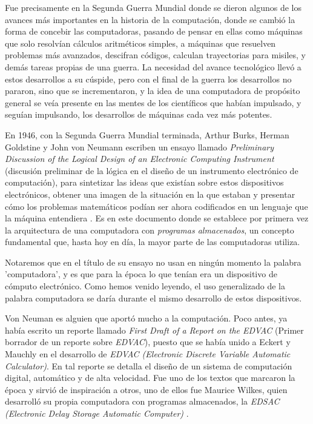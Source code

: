 \documentclass[letterpaper,12pt,oneside]{book}
\begin{document}
		Fue precisamente en la Segunda Guerra Mundial donde se dieron algunos de los avances más importantes en la historia de la computación, donde se cambió la forma de
		concebir las computadoras, pasando de pensar en ellas como máquinas que solo resolvían cálculos aritméticos simples, a máquinas que resuelven problemas más avanzados, descifran
		códigos, calculan trayectorias para
		misiles, y demás tareas propias de una guerra. La necesidad del avance tecnológico llevó a estos desarrollos a su cúspide, pero con el final de
		la guerra los desarrollos no pararon, sino que se incrementaron, y la idea de una computadora de propósito general se veía
		presente en las mentes de los científicos que habían impulsado, y seguían impulsando, los desarrollos de máquinas cada vez más potentes.
		

		En 1946, con la Segunda Guerra Mundial terminada, Arthur Burks, Herman Goldstine y John von Neumann 
		escriben
		un  ensayo llamado \textit{Preliminary Discussion of the Logical Design of an Electronic Computing Instrument} (discusión preliminar de la lógica en el diseño de un instrumento electrónico de computación), para sintetizar las ideas que existían sobre estos dispositivos electrónicos, obtener una imagen de la situación en la que estaban y
		presentar cómo los problemas matemáticos podían ser ahora codificados en un lenguaje que la máquina entendiera \cite{randell_preliminary_1982}. Es en este documento donde
		se establece por primera vez la arquitectura de una computadora con  \textit{programas almacenados}, un concepto fundamental que, hasta hoy
		en día, la mayor parte de las computadoras utiliza.
  
        Notaremos que en el título de su ensayo no usan en ningún momento la palabra 'computadora', y
		es que para la época lo que tenían era un dispositivo de cómputo electrónico. Como hemos venido leyendo, el uso generalizado de la palabra computadora
		se daría durante el mismo desarrollo de estos dispositivos.
  
        Von Neuman es alguien que aportó mucho a la computación. Poco antes, ya había escrito un reporte llamado \textit{First Draft of a Report on the EDVAC} (Primer borrador de un reporte sobre \textit{EDVAC}),
		puesto que se había unido a Eckert y Mauchly en el desarrollo de
		\textit{EDVAC (Electronic Discrete Variable Automatic Calculator)}. En tal reporte se detalla el diseño de un sistema de computación digital, automático
		y de alta velocidad. Fue uno de los textos que marcaron la época y sirvió de inspiración a otros, uno de ellos fue Maurice Wilkes, quien desarrolló su propia
		computadora con programas almacenados, la \textit{EDSAC (Electronic Delay Storage Automatic Computer)} \cite{oregan_brief_2012}. 
  
\end{document}
